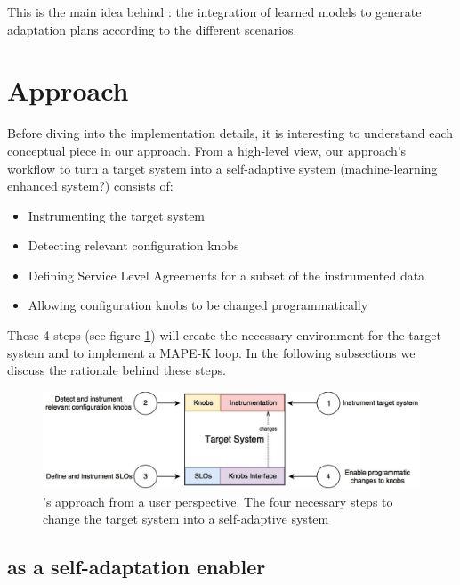 This is the main idea behind \projectname{}: the integration of learned models to generate adaptation plans according to the different scenarios.

\section{Approach}
\label{sec:approach}


Before diving into the implementation details, it is interesting to understand each conceptual piece in our approach. From a high-level view, our approach's workflow to turn a target system into a self-adaptive system (machine-learning enhanced system?) consists of:

\begin{itemize}
  \item Instrumenting the target system
  \item Detecting relevant configuration knobs
  \item Defining Service Level Agreements for a subset of the instrumented data
  \item Allowing configuration knobs to be changed programmatically
\end{itemize}

These 4 steps (see figure \ref{fig:finch1}) will create the necessary environment for the target system and \projectname{} to implement a MAPE-K loop. In the following subsections we discuss the rationale behind these steps. 

\begin{figure}[t]
  \includegraphics[width=\textwidth]{images/finch_user_perspective.jpg}
  \caption{\projectname{}'s approach from a user perspective. The four necessary steps to change the target system into a self-adaptive system}
  \label{fig:finch1}
\end{figure}

\subsection{\projectname{} as a self-adaptation enabler}

